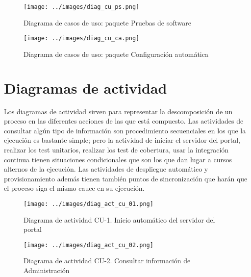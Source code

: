 \begin{figure}[!ht]
  \begin{center}
  \texttt{[image: ../images/diag\_cu\_ps.png]}
  \caption{Diagrama de casos de uso: paquete Pruebas de software}
  \label{fig:diag_cu_ps}
  \end{center}
\end{figure}

\begin{figure}[!ht]
  \begin{center}
  \texttt{[image: ../images/diag\_cu\_ca.png]}
  \caption{Diagrama de casos de uso: paquete Configuración automática}
  \label{fig:diag_cu_ca}
  \end{center}
\end{figure}

\newpage
\section{Diagramas de actividad}

Los diagramas de actividad sirven para representar la descomposición de un proceso en las diferentes acciones de las que está compuesto. Las actividades de consultar algún tipo de información son procedimiento secuenciales en los que la ejecución es bastante simple; pero la actividad de iniciar el servidor del portal, realizar los test unitarios, realizar los test de cobertura, usar la integración continua tienen situaciones condicionales que son los que dan lugar a cursos alternos de la ejecución. Las actividades de despliegue automático y provisionamiento además tienen también puntos de sincronización que harán que el proceso siga el mismo cauce en su ejecución.

\begin{figure}[!ht]
  \begin{center}
  \texttt{[image: ../images/diag\_act\_cu\_01.png]}
  \caption{Diagrama de actividad CU-1. Inicio automático del servidor del portal}
  \label{fig:diag_act_cu_01}
  \end{center}
\end{figure}

\begin{figure}[!ht]
  \begin{center}
  \texttt{[image: ../images/diag\_act\_cu\_02.png]}
  \caption{Diagrama de actividad CU-2. Consultar información de Administración}
  \label{fig:diag_act_cu_02}
  \end{center}
\end{figure}

